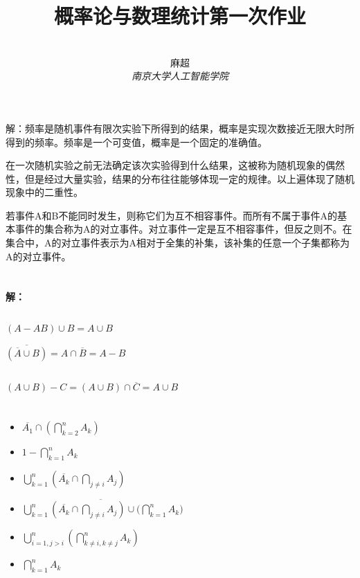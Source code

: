 \documentclass[12pt,a4paper]{ctexart}
\title{\textbf{概率论与数理统计第一次作业}}
\author{
\\
\Large{麻超 \quad 201300066}
\\[6pt]
{ \large \textit{南京大学人工智能学院}}\\[2pt]
}
\date{}
\begin{document}
\maketitle
\setcounter{page}{1}

\section{}
解：频率是随机事件有限次实验下所得到的结果，概率是实现次数接近无限大时所得到的频率。频率是一个可变值，概率是一个固定的准确值。
\par
在一次随机实验之前无法确定该次实验得到什么结果，这被称为随机现象的偶然性，但是经过大量实验，结果的分布往往能够体现一定的规律。以上遍体现了随机现象中的二重性。
\par
若事件A和B不能同时发生，则称它们为互不相容事件。而所有不属于事件A的基本事件的集合称为A的对立事件。对立事件一定是互不相容事件，但反之则不。在集合中，A的对立事件表示为A相对于全集的补集，该补集的任意一个子集都称为A的对立事件。
\section{}
\textbf{解： }
\subsection{}
$(A-AB)\cup B=A\cup B$

$\overline{(\overline{A}\cup B )} =A\cap \overline{B}=A-B$
\subsection{}
$(A\cup B)-C=(A\cup B)\cap \overline{C}=A\cup B$
\section{}
\begin{itemize}
	\item $\overline{A_1}\cap(\bigcap_{k=2}^n A_k)$
	\item $1-\bigcap_{k=1}^n A_k$
	\item $\bigcup_{k=1}^n (\overline{A_k}\cap \bigcap_{j\neq i}A_j)$
	\item $\overline{\bigcup_{k=1}^n (\overline{A_k}\cap \bigcap_{j\neq i}A_j)\cup (\bigcap_{k=1}^n A_k})$
	\item $\bigcup_{i=1,j>i}^n(\bigcap_{k\neq i,k\neq j}^n A_k )$
	\item $\bigcap_{k=1}^n A_k$
\end{itemize}
\end{document}
